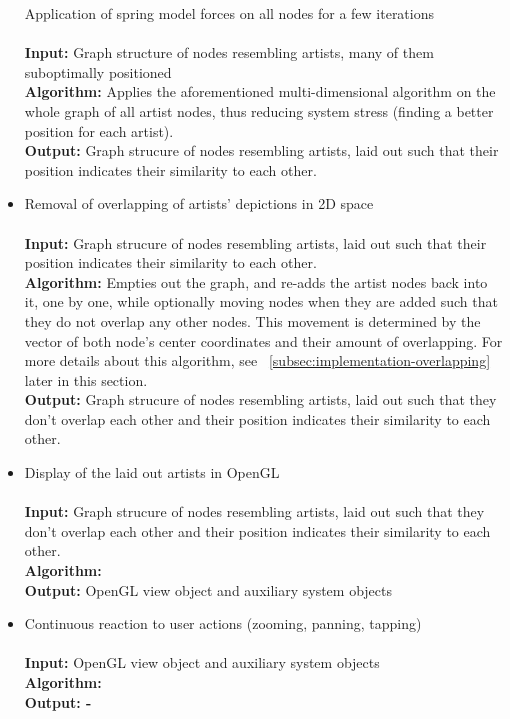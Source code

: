 \begin{itemize}
		\subitem Application of spring model forces on all nodes for a few iterations \\\\
				\textbf{Input:} Graph structure of nodes resembling artists, many of them suboptimally positioned \\
				\textbf{Algorithm:} Applies the aforementioned multi-dimensional algorithm on the whole graph of
				all artist nodes, thus reducing system stress (finding a better position for each artist).  \\
				\textbf{Output:} Graph strucure of nodes resembling artists, laid out such that their position 
				indicates their similarity to each other.\\
				
	\item Removal of overlapping of artists' depictions in 2D space	\\\\
				\textbf{Input:} Graph strucure of nodes resembling artists, laid out such that their position 
				indicates their similarity to each other. \\
				\textbf{Algorithm:} Empties out the graph, and re-adds the artist nodes back into it, one by one,
				while optionally moving nodes when they are added such that they do not overlap any other nodes. This
				movement is determined by the vector of both node's center coordinates and their amount
				of overlapping. For more details about this algorithm, see 
				~\ref{subsec:implementation-overlapping} later in this section. \\
				\textbf{Output:} Graph strucure of nodes resembling artists, laid out such that they don't 
				overlap each other and their position indicates their similarity to each other. \\
				
	\item Display of the laid out artists in OpenGL	\\\\
				\textbf{Input:} Graph strucure of nodes resembling artists, laid out such that they don't 
				overlap each other and their position indicates their similarity to each other. \\
				\textbf{Algorithm:} \\
				\textbf{Output:} OpenGL view object and auxiliary system objects \\
				
	\item Continuous reaction to user actions (zooming, panning, tapping) \\\\
				\textbf{Input:} OpenGL view object and auxiliary system objects \\
				\textbf{Algorithm:}  \\
				\textbf{Output: -}
\end{itemize}

